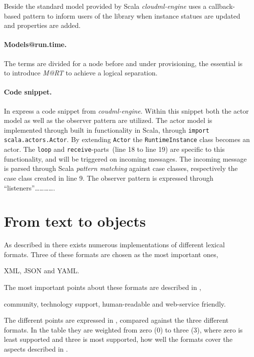 Beside the standard model provided by Scala \emph{cloudml-engine} uses
a callback-based pattern to inform users of the library when instance statues
are updated and properties are added.

\paragraph{Models@run.time.}

The terms are divided for a node before and under provisioning, the essential is to introduce 
\emph{M@RT} to achieve a logical separation.

\paragraph{Code snippet.}


In  express a code snippet from \emph{coudml-engine}.
Within this snippet both the actor model as well as the observer pattern are utilized.
The actor model is implemented through built in functionality in Scala,
through \texttt{import scala.actors.Actor}.
By extending \texttt{Actor} the \texttt{RuntimeInstance} class becomes an actor.
The \texttt{loop} and \texttt{receive}-parts~(line 18 to line 19) are specific to this functionality,
and will be triggered on incoming messages.
The incoming message is parsed through Scala \emph{pattern matching} against case classes,
respectively the case class created in line 9.
The observer pattern is expressed through ``listeners''\ldots\ldots\ldots\ldots.

\section{From text to objects}


As described in  there exists numerous implementations of different lexical formats.
Three of these formats are chosen as the most important ones,
\begin{ii}
  \iitem XML,
  \iitem JSON and
  \iitem YAML.
\end{ii}
The most important points about these formats are described in ,
\ie
\begin{ii}
  \iitem community,
  \iitem technology support,
  \iitem human-readable and
  \iitem web-service friendly.
\end{ii}
The different points are expressed in , 
compared against the three different formats.
In the table they are weighted from zero ($0$) to three ($3$),
where zero is least supported and three is most supported,
\ie how well the formats cover the aspects described in .


